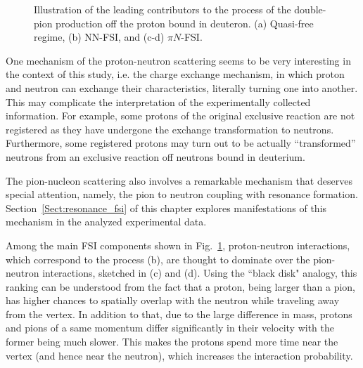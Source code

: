 \begin{figure}[!ht]
\begin{center}
\end{center}
\caption{\small Illustration of the leading contributors to the process of the double-pion production off the proton bound in deuteron. (a) Quasi-free regime, (b) NN-FSI, and (c-d) $\pi N$-FSI.}
\label{fig:fsi_mech}
\end{figure}


One mechanism of the proton-neutron scattering seems to be very interesting in the context of this study, i.e. the charge exchange mechanism, in which proton and neutron can exchange their characteristics, literally turning one into another. This may complicate the interpretation of the experimentally collected information. For example, some protons of the original exclusive reaction are not registered as they have undergone the exchange transformation to neutrons. Furthermore, some registered protons may turn out to be actually ``transformed'' neutrons from an exclusive reaction off neutrons bound in deuterium. 

The pion-nucleon scattering also involves a remarkable mechanism that deserves special attention, namely, the pion to neutron coupling with resonance formation. Section~\ref{Sect:resonance_fsi} of this chapter explores manifestations of this mechanism in the analyzed experimental data.


Among the main FSI components shown in Fig.~\ref{fig:fsi_mech}, proton-neutron interactions, which correspond to the process (b), are thought to dominate over the pion-neutron interactions, sketched in (c) and (d). Using the ``black disk" analogy, this ranking can be understood from the fact that a proton, being larger than a pion, has higher chances to spatially overlap with the neutron while traveling away from the vertex. In addition to that, due to the large difference in mass, protons and pions of a same momentum differ significantly in their velocity with the former being much slower. This makes the protons spend more time near the vertex (and hence near the neutron), which increases the interaction probability.


